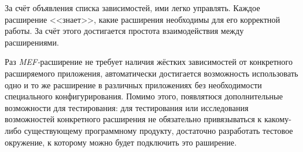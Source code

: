 За счёт объявления списка зависимостей, ими легко управлять. Каждое расширение <<знает>>, какие расширения необходимы для его корректной работы. За счёт этого достигается простота взаимодействия между расширениями.

Раз {\it MEF-}расширение не требует наличия жёстких зависимостей от конкретного расширяемого приложения, автоматически достигается возможность использовать одно и то же расширение в различных приложениях без необходимости специального конфигурирования. Помимо этого, появлятюся дополнительные возможности для тестирования: для тестирования или исследования возможностей конкретного расширения не обязательно привязываться к какому-либо существующему программному продукту, достаточно разработать тестовое окружение, к которому можно будет подключить это раширение.
